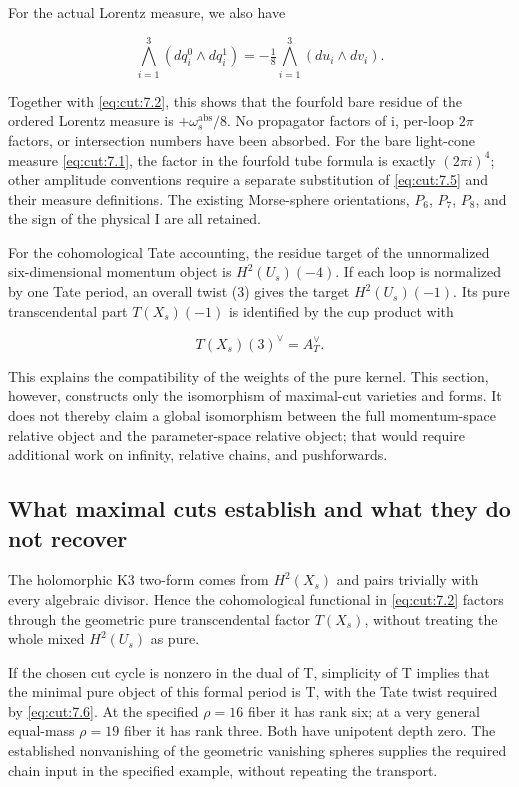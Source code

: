 \documentclass[11pt,a4paper,oneside]{article}
\theoremstyle{plain}
\theoremstyle{definition}
\theoremstyle{remark}
\numberwithin{equation}{section}
\begin{document}
For the actual Lorentz measure, we also have

\begin{equation}
\bigwedge_{i=1}^3(dq_i^0\wedge dq_i^1)
       =-\tfrac18\bigwedge_{i=1}^3(du_i\wedge dv_i).  \label{eq:cut:7.5}
\end{equation}

Together with \eqref{eq:cut:7.2}, this shows that the fourfold bare residue of the ordered Lorentz measure is \(+\omega _s^{\mathrm{abs}}/8\). No propagator factors of i, per-loop \(2\pi \) factors, or intersection numbers have been absorbed. For the bare light-cone measure \eqref{eq:cut:7.1}, the factor in the fourfold tube formula is exactly \((2\pi i)^{4}\); other amplitude conventions require a separate substitution of \eqref{eq:cut:7.5} and their measure definitions. The existing Morse-sphere orientations, \(P_6\), \(P_7\), \(P_8\), and the sign of the physical I are all retained.

For the cohomological Tate accounting, the residue target of the unnormalized six-dimensional momentum object is \(H^{2}(U_s)(- 4)\). If each loop is normalized by one Tate period, an overall twist (3) gives the target \(H^{2}(U_s)(- 1)\). Its pure transcendental part \(T(X_s)(- 1)\) is identified by the cup product with

\begin{equation}
T(X_s)(3)^\vee=A_T^\vee.            \label{eq:cut:7.6}
\end{equation}

This explains the compatibility of the weights of the pure kernel. This section, however, constructs only the isomorphism of maximal-cut varieties and forms. It does not thereby claim a global isomorphism between the full momentum-space relative object and the parameter-space relative object; that would require additional work on infinity, relative chains, and pushforwards.


\subsection{What maximal cuts establish and what they do not recover}\label{sec:cut:8}

The holomorphic K3 two-form comes from \(H^{2}(X_s)\) and pairs trivially with every algebraic divisor. Hence the cohomological functional in \eqref{eq:cut:7.2} factors through the geometric pure transcendental factor \(T(X_s)\), without treating the whole mixed \(H^{2}(U_s)\) as pure.

If the chosen cut cycle is nonzero in the dual of T, simplicity of T implies that the minimal pure object of this formal period is T, with the Tate twist required by \eqref{eq:cut:7.6}. At the specified \(\rho=16\) fiber it has rank six; at a very general equal-mass \(\rho=19\) fiber it has rank three. Both have unipotent depth zero. The established nonvanishing of the geometric vanishing spheres supplies the required chain input in the specified example, without repeating the transport.
\end{document}
